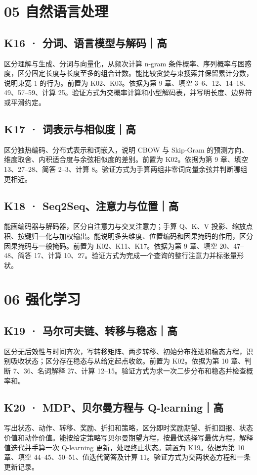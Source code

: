 \documentclass[UTF8,a4paper,11pt]{ctexart}
\begin{document}
\section{05 自然语言处理}
\subsection{K16 · 分词、语言模型与解码｜高}
区分理解与生成、分词与向量化，从频次计算 n-gram 条件概率、序列概率与困惑度，区分固定长度与长度至多的组合计数。能比较贪婪与束搜索并保留累计分数，说明束宽 1 的行为。前置为 K02、K03。依据为第 9 章、填空 3–6、12、14–18、49、57–59、计算 25。验证方式为交概率计算和小型解码表，并写明长度、边界符或平滑约定。

\subsection{K17 · 词表示与相似度｜高}
区分独热编码、分布式表示和词嵌入，说明 CBOW 与 Skip-Gram 的预测方向、维度取舍、内积适合度与余弦相似度的差别。前置为 K02。依据为第 9 章、填空 13、27–28、简答 2–3、计算 8。验证方式为手算两组非零词向量余弦并判断哪组更相近。

\subsection{K18 · Seq2Seq、注意力与位置｜高}
能画编码器与解码器，区分自注意力与交叉注意力；手算 Q、K、V 投影、缩放点积、按键归一化与加权输出。能说明多头维度、位置编码和因果掩码的作用，区分因果掩码与一般掩码。前置为 K02、K11、K17。依据为第 9 章、填空 20、47–48、简答 17、计算 10、27。验证方式为完成一个查询的整行注意力并标张量形状。

\section{06 强化学习}
\subsection{K19 · 马尔可夫链、转移与稳态｜高}
区分无后效性与时间齐次，写转移矩阵、两步转移、初始分布推进和稳态方程，识别吸收状态；区分存在稳态与从给定起点收敛。前置为 K02。依据为第 10 章、判断 7、36、名词解释 27、计算 12–15。验证方式为求一次二步分布和稳态并检查概率和。

\subsection{K20 · MDP、贝尔曼方程与 Q-learning｜高}
写出状态、动作、转移、奖励、折扣和策略，区分即时奖励期望、折扣回报、状态价值和动作价值。能按给定策略写贝尔曼期望方程，按最优选择写最优方程，解释值迭代并手算一次 Q-learning 更新，处理终止状态。前置为 K19。依据为第 10 章、填空 44–45、50–51、值迭代简答及计算 11。验证方式为交两状态方程和一条更新记录。
\end{document}
